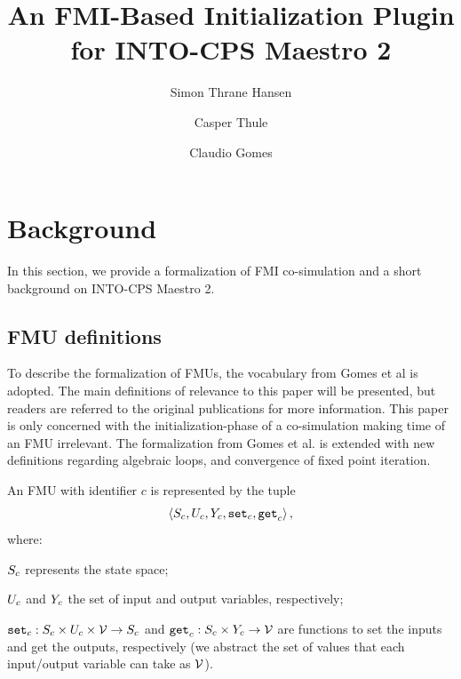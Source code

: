 \documentclass[runningheads]{llncs}
\begin{document}
%
\title{An FMI-Based Initialization Plugin for INTO-CPS Maestro 2}
%
%
\author{Simon Thrane Hansen \and
Casper Thule \and
Claudio Gomes }
%
%
%
\maketitle              %
%






\section{Background}\label{sc:background}
In this section, we provide a formalization of FMI co-simulation and a short background on INTO-CPS Maestro 2.

\subsection{FMU definitions}
To describe the formalization of FMUs, the vocabulary from Gomes et al\cite{gomes_lucio_vangheluwe_2019, Gomes2018} is adopted. The main definitions of relevance to this paper will be presented, but readers are referred to the original publications for more information. This paper is only concerned with the initialization-phase of a co-simulation making time of an FMU irrelevant. The formalization from Gomes et al. is extended with new definitions regarding algebraic loops, and convergence of fixed point iteration.
\begin{definition}[FMU]\label{def:fmu}
  An FMU with identifier $c$ is represented by the tuple   
  $$ \left\langle S_{c}, U_{c}, Y_{c}, \mathtt{set}_{c}, \mathtt{get}_{c} \right\rangle ,$$
  where:
  \begin{inparadesc}
    \item $S_{c}$ represents the state space;
    \item $U_{c}$ and $Y_{c}$ the set of input and output variables, respectively;
    \item $\mathtt{set}_{c} : S_{c} \times U_{c} \times \mathcal{V} \to S_{c}$ and $\mathtt{get}_{c}: S_{c} \times Y_{c} \to \mathcal{V}$ are functions to set the inputs and get the outputs, respectively (we abstract the set of values that each input/output variable can take as $\mathcal{V}$).
  \end{inparadesc}
\end{definition}
\end{document}
